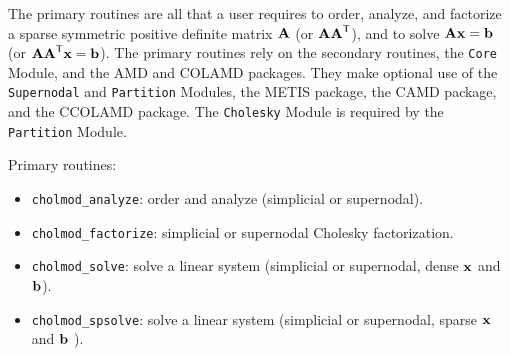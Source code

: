 \documentclass[11pt]{article}
\newcommand{\m}[1]{{\bf{#1}}}       %
\newcommand{\tr}{^{\sf T}}          %
\begin{document}
The primary routines are all that a user requires to order, analyze, and
factorize a sparse symmetric positive definite matrix $\m{A}$ (or $\m{AA}\tr$), and
to solve $\m{Ax}=\m{b}$ (or $\m{AA}\tr\m{x}=\m{b}$).  The primary routines rely on the secondary
routines, the {\tt Core} Module, and the AMD and COLAMD packages.  They
make optional use of the {\tt Supernodal} and {\tt Partition} Modules, the
METIS package, the CAMD package, and
the CCOLAMD package.  The {\tt Cholesky} Module is
required by the {\tt Partition} Module.

\vspace{0.1in}
\noindent Primary routines:
    \begin{itemize}
    \item {\tt cholmod\_analyze}: order and analyze (simplicial or supernodal).
    \item {\tt cholmod\_factorize}: simplicial or supernodal Cholesky factorization.
    \item {\tt cholmod\_solve}: solve a linear system (simplicial or supernodal, dense $\m{x}$ and $\m{b}$).
    \item {\tt cholmod\_spsolve}: solve a linear system (simplicial or supernodal, sparse $\m{x}$ and $\m{b}$ ).
    \end{itemize}
\end{document}
